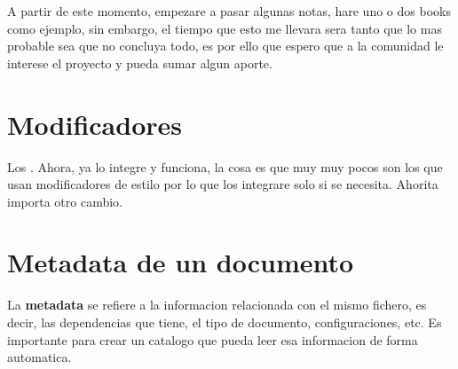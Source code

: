 \documentclass{article}
\begin{document}
  A partir de este momento, empezare a pasar algunas notas, hare uno o dos books como
  ejemplo, sin embargo, el tiempo que esto me llevara sera tanto que lo mas
  probable sea que no concluya todo, es por ello que espero que a la comunidad
  le interese el proyecto y pueda sumar algun aporte.

  \section{Modificadores}
  
  Los . Ahora, ya lo
  integre y funciona, la cosa es que muy muy pocos son los que usan modificadores
  de estilo por lo que los integrare solo si se necesita. Ahorita importa otro cambio.
  
  \section{ Metadata de un documento }
  
  La {\bfseries metadata} se refiere a la informacion relacionada con el mismo fichero,
  es decir, las dependencias que tiene, el tipo de documento, configuraciones, etc. Es
  importante para crear un catalogo que pueda leer esa informacion de forma automatica.
\end{document}

